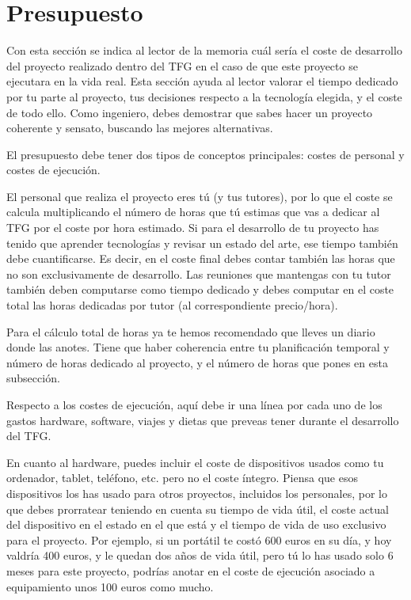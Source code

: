 \section{Presupuesto}

Con esta sección se indica al lector de la memoria cuál sería el coste de desarrollo del proyecto realizado dentro del TFG en el caso de que este proyecto se ejecutara en la vida real. Esta sección ayuda al lector valorar el tiempo dedicado por tu parte al proyecto, tus decisiones respecto a la tecnología elegida, y el coste de todo ello. Como ingeniero, debes demostrar que sabes hacer un proyecto coherente  y sensato, buscando las mejores alternativas. 

El presupuesto debe tener dos tipos de conceptos principales: costes de personal y costes de ejecución.

El personal que realiza el proyecto eres tú (y tus tutores), por lo que el coste se calcula multiplicando el número de horas que tú estimas que vas a dedicar al TFG por el coste por hora estimado. Si para el desarrollo de tu proyecto has tenido que aprender tecnologías y revisar un estado del arte, ese tiempo también debe cuantificarse. Es decir, en el coste final debes contar también las horas que no son exclusivamente de desarrollo. Las reuniones que mantengas con tu tutor también deben computarse como tiempo dedicado y debes computar en el coste total las horas dedicadas por tutor (al correspondiente precio/hora).

Para el cálculo total de horas ya te hemos recomendado que lleves un diario donde las anotes. Tiene que haber coherencia entre tu planificación temporal y número de horas dedicado al proyecto, y el número de horas que pones en esta subsección.

Respecto a los costes de ejecución, aquí debe ir una línea por cada uno de los gastos hardware, software, viajes y dietas que preveas tener durante el desarrollo del TFG. 

En cuanto al hardware, puedes incluir el coste de dispositivos usados como tu ordenador, tablet, teléfono, etc. pero no el coste íntegro. Piensa que esos dispositivos los has usado para otros proyectos, incluidos los personales, por lo que debes prorratear teniendo en cuenta su tiempo de vida útil, el coste actual del dispositivo en el estado en el que está y el tiempo de vida de uso exclusivo para el proyecto. Por ejemplo, si un portátil te costó 600 euros en su día, y hoy valdría 400 euros, y le quedan dos años de vida útil, pero tú lo has usado solo 6 meses para este proyecto, podrías anotar en el coste de ejecución asociado a equipamiento unos 100 euros como mucho.  

